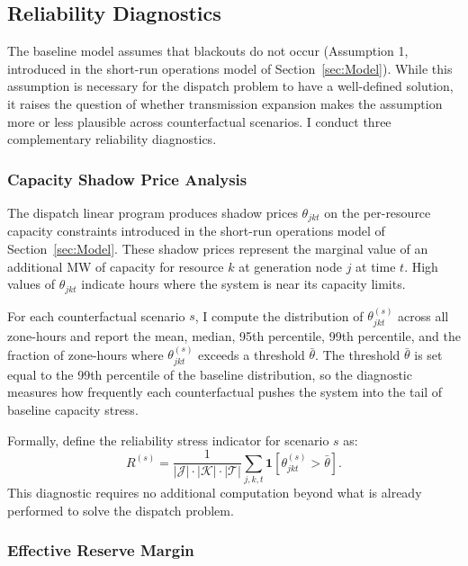\documentclass[12pt]{article}
\begin{document}
\subsection{Reliability Diagnostics}\label{app:robustness:reliability}

The baseline model assumes that blackouts do not occur (Assumption 1, introduced in the short-run operations model of Section~\ref{sec:Model}). While this assumption is necessary for the dispatch problem to have a well-defined solution, it raises the question of whether transmission expansion makes the assumption more or less plausible across counterfactual scenarios. I conduct three complementary reliability diagnostics.

\subsubsection{Capacity Shadow Price Analysis}

The dispatch linear program produces shadow prices $\theta_{jkt}$ on the per-resource capacity constraints introduced in the short-run operations model of Section~\ref{sec:Model}. These shadow prices represent the marginal value of an additional MW of capacity for resource $k$ at generation node $j$ at time $t$. High values of $\theta_{jkt}$ indicate hours where the system is near its capacity limits.

For each counterfactual scenario $s$, I compute the distribution of $\theta_{jkt}^{(s)}$ across all zone-hours and report the mean, median, 95th percentile, 99th percentile, and the fraction of zone-hours where $\theta_{jkt}^{(s)}$ exceeds a threshold $\bar{\theta}$. The threshold $\bar{\theta}$ is set equal to the 99th percentile of the baseline distribution, so the diagnostic measures how frequently each counterfactual pushes the system into the tail of baseline capacity stress.

Formally, define the reliability stress indicator for scenario $s$ as:
\begin{equation}
    R^{(s)} = \frac{1}{|\mathcal{J}| \cdot |\mathcal{K}| \cdot |\mathcal{T}|} \sum_{j,k,t} \mathbf{1}\left[\theta_{jkt}^{(s)} > \bar{\theta}\right].
\end{equation}
This diagnostic requires no additional computation beyond what is already performed to solve the dispatch problem.

\subsubsection{Effective Reserve Margin}
\end{document}
